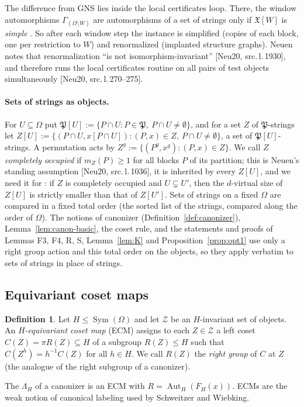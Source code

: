 \documentclass[11pt]{article}
\theoremstyle{plain}
\theoremstyle{definition}
\newtheorem{definition}[theorem]{Definition}
\theoremstyle{remark}
\theoremstyle{named}
\theoremstyle{namedrm}
\newcommand{\Sym}{\operatorname{Sym}}
\newcommand{\Aut}{\operatorname{Aut}}
\newcommand{\fX}{\mathfrak{X}}
\newcommand{\fP}{\mathfrak{P}}
\newcommand{\cZ}{\mathcal{Z}}
\newcommand{\src}[2]{[#1, src.\,l.\,#2]}
\begin{document}
The difference from GNS lies inside the local certificates loop. There, the window automorphisms
$\Gamma_{(\Omega\setminus W)}$ are automorphisms of a set of strings only if $\fX[W]$ is \emph{simple}
\cite[Lemma~4.16]{Neu20}. So after each window step the instance is simplified \cite[Thm.~4.17]{Neu20}
(copies of each block, one per restriction to $W$) and renormalized \cite[Thm.~4.9]{Neu20} (implanted
structure graphs). Neuen notes that renormalization ``is not isomorphism-invariant''
\src{Neu20}{1930}, and therefore runs the local certificates routine on all pairs of test objects
simultaneously \src{Neu20}{270--275}.

\paragraph{Sets of strings as objects.} For $U\subseteq\Omega$ put
$\fP[U]:=\{P\cap U:P\in\fP,\ P\cap U\ne\emptyset\}$, and for a set $Z$ of $\fP$-strings let
$Z[U]:=\{(P\cap U,x[P\cap U]):(P,x)\in Z,\ P\cap U\ne\emptyset\}$, a set of $\fP[U]$-strings. A permutation acts by
$Z^g:=\{(P^g,x^g):(P,x)\in Z\}$. We call $Z$ \emph{completely occupied} if $m_Z(P)\ge1$ for all blocks $P$
of its partition; this is Neuen's standing assumption \src{Neu20}{1036}, it is inherited by every
$Z[U]$, and we need it for \cite[Obs.~4.12]{Neu20}: if $Z$ is completely occupied and $U\subsetneq U'$, then the
$d$-virtual size of $Z[U]$ is strictly smaller than that of $Z[U']$. Sets of strings on a fixed $\Omega$ are
compared in a fixed total order (the sorted list of the strings, compared along the order of $\Omega$). The
notions of canonizer (Definition~\ref{def:canonizer}), Lemma~\ref{lem:canon-basic}, the coset rule, and the
statements and proofs of Lemmas F3, F4, R, S, Lemma~\ref{lem:K} and Proposition~\ref{prop:opt1} use only a
right group action and this total order on the objects, so they apply verbatim to sets of strings in place
of strings.

\subsection{Equivariant coset maps}

\begin{definition}\label{def:ECM}
Let $H\le\Sym(\Omega)$ and let $\cZ$ be an $H$-invariant set of objects. An \emph{$H$-equivariant coset map}
(ECM) assigns to each $Z\in\cZ$ a left coset $C(Z)=\pi R(Z)\subseteq H$ of a subgroup $R(Z)\le H$ such that
$C(Z^h)=h^{-1}C(Z)$ for all $h\in H$. We call $R(Z)$ the \emph{right group} of $C$ at $Z$ (the analogue of
the right subgroup of a canonizer).
\end{definition}
The $\Lambda_H$ of a canonizer is an ECM with $R=\Aut_H(F_H(x))$. ECMs are the weak notion of canonical
labeling used by Schweitzer and Wiebking.
\end{document}
